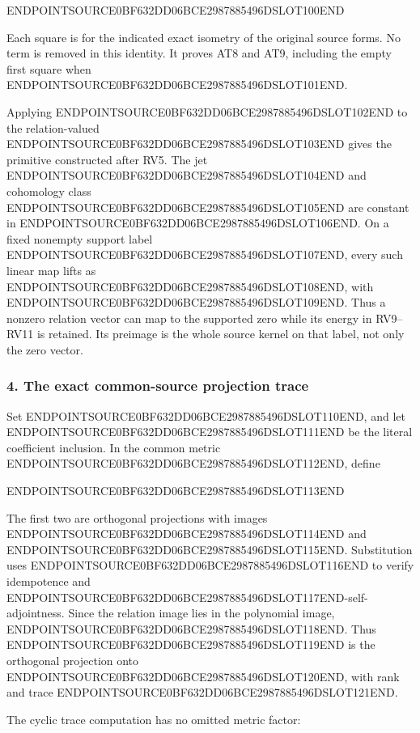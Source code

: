 ENDPOINTSOURCE0BF632DD06BCE2987885496DSLOT100END

Each square is for the indicated exact isometry of the original source forms. No term is removed in this identity. It proves AT8 and AT9, including the empty first square when ENDPOINTSOURCE0BF632DD06BCE2987885496DSLOT101END.

Applying ENDPOINTSOURCE0BF632DD06BCE2987885496DSLOT102END to the relation-valued ENDPOINTSOURCE0BF632DD06BCE2987885496DSLOT103END gives the primitive constructed after RV5. The jet ENDPOINTSOURCE0BF632DD06BCE2987885496DSLOT104END and cohomology class ENDPOINTSOURCE0BF632DD06BCE2987885496DSLOT105END are constant in ENDPOINTSOURCE0BF632DD06BCE2987885496DSLOT106END. On a fixed nonempty support label ENDPOINTSOURCE0BF632DD06BCE2987885496DSLOT107END, every such linear map lifts as ENDPOINTSOURCE0BF632DD06BCE2987885496DSLOT108END, with ENDPOINTSOURCE0BF632DD06BCE2987885496DSLOT109END. Thus a nonzero relation vector can map to the supported zero while its energy in RV9--RV11 is retained. Its preimage is the whole source kernel on that label, not only the zero vector.

\subsubsection{4. The exact common-source projection trace}\label{endpoint-determinant_review--the-exact-common-source-projection-trace}

Set ENDPOINTSOURCE0BF632DD06BCE2987885496DSLOT110END, and let ENDPOINTSOURCE0BF632DD06BCE2987885496DSLOT111END be the literal coefficient inclusion. In the common metric ENDPOINTSOURCE0BF632DD06BCE2987885496DSLOT112END, define

ENDPOINTSOURCE0BF632DD06BCE2987885496DSLOT113END

The first two are orthogonal projections with images ENDPOINTSOURCE0BF632DD06BCE2987885496DSLOT114END and ENDPOINTSOURCE0BF632DD06BCE2987885496DSLOT115END. Substitution uses ENDPOINTSOURCE0BF632DD06BCE2987885496DSLOT116END to verify idempotence and ENDPOINTSOURCE0BF632DD06BCE2987885496DSLOT117END-self-adjointness. Since the relation image lies in the polynomial image, ENDPOINTSOURCE0BF632DD06BCE2987885496DSLOT118END. Thus ENDPOINTSOURCE0BF632DD06BCE2987885496DSLOT119END is the orthogonal projection onto ENDPOINTSOURCE0BF632DD06BCE2987885496DSLOT120END, with rank and trace ENDPOINTSOURCE0BF632DD06BCE2987885496DSLOT121END.

The cyclic trace computation has no omitted metric factor:

